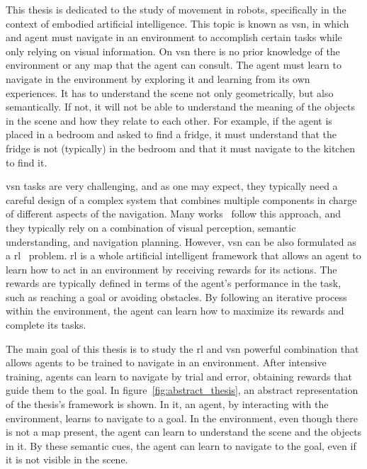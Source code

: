 This thesis is dedicated to the study of movement in robots, specifically in the context of embodied artificial intelligence.
This topic is known as \acrfull{vsn}, in which and agent must navigate in an environment to accomplish certain tasks while only relying on visual information.
On \acrshort{vsn} there is no prior knowledge of the environment or any map that the agent can consult.
The agent must learn to navigate in the environment by exploring it and learning from its own experiences.
It has to understand the scene not only geometrically, but also semantically.
If not, it will not be able to understand the meaning of the objects in the scene and how they relate to each other.
For example, if the agent is placed in a bedroom and asked to find a fridge, it must understand that the fridge is not (typically) in the bedroom and that it must navigate to the kitchen to find it.

\acrshort{vsn} tasks are very challenging, and as one may expect, they typically need a careful design of a complex system that combines multiple components in charge of different aspects of the navigation.
Many works~\cite{newcombe2011, thrun2001, jones2011, sattler2018, Kazerouni2022, campos2021, labbe2022, zhang2018, rosinol2020, jin2023} follow this approach, and they typically rely on a combination of visual perception, semantic understanding, and navigation planning.
However, \acrshort{vsn} can be also formulated as a \acrfull{rl}~\cite{sutton2018} problem.
\acrshort{rl} is a whole artificial intelligent framework that allows an agent to learn how to act in an environment by receiving rewards for its actions.
The rewards are typically defined in terms of the agent's performance in the task, such as reaching a goal or avoiding obstacles.
By following an iterative process within the environment, the agent can learn how to maximize its rewards and complete its tasks.

The main goal of this thesis is to study the \acrshort{rl} and \acrshort{vsn} powerful combination that allows agents to be trained to navigate in an environment.
After intensive training, agents can learn to navigate by trial and error, obtaining rewards that guide them to the goal.
In figure~\ref{fig:abstract_thesis}, an abstract representation of the thesis's framework is shown.
In it, an agent, by interacting with the environment, learns to navigate to a goal.
In the environment, even though there is not a map present, the agent can learn to understand the scene and the objects in it.
By these semantic cues, the agent can learn to navigate to the goal, even if it is not visible in the scene.

